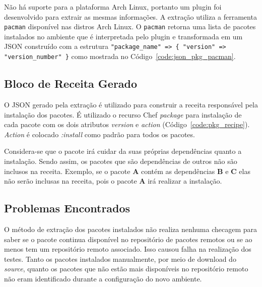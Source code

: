 Não há suporte para a plataforma Arch Linux, portanto um plugin foi desenvolvido
para extrair as mesmas informações. A extração utiliza a ferramenta \texttt{pacman} disponível
nas distros Arch Linux. O \texttt{pacman} retorna uma lista de pacotes instalados no ambiente
que é interpretada pelo plugin e transformada em um JSON construído com a estrutura
\texttt{"package\_name" => \{ "version" => "version\_number" \}} como mostrada no
Código~\ref{code:json_pkg_pacman}.

\noindent\begin{minipage}{\textwidth}
  \lstset{style=shell}
  
\end{minipage}\hfill

\subsection{Bloco de Receita Gerado}

O JSON gerado pela extração é utilizado para construir a receita responsável pela instalação dos
pacotes. É utilizado o recurso Chef \textit{package} para instalação de cada pacote com os dois atributos
\textit{version} e \textit{action} (Código~\ref{code:pkg_recipe}). \textit{Action} é colocado \textit{\textit{:install}}
como padrão para todos os pacotes.

\noindent\begin{minipage}{\textwidth}
  \lstset{style=shell}
  
\end{minipage}\hfill

Considera-se que o pacote irá cuidar da suas próprias dependências quanto a instalação.
Sendo assim, os pacotes que são dependências de outros não são inclusos na receita. Exemplo, se o pacote
\textbf{A} contém as dependências \textbf{B} e \textbf{C} elas não serão inclusas na receita, pois o pacote \textbf{A} irá realizar a instalação.

\subsection{Problemas Encontrados}

O método de extração dos pacotes instalados não realiza nenhuma checagem para
saber se o pacote continua disponível no repositório de pacotes remotos ou
se ao menos tem um repositório remoto associado. Isso causou falha na realização
dos testes. Tanto os pacotes instalados manualmente, por meio de download do
\textit{source}, quanto os pacotes que não estão mais disponíveis no repositório remoto
não eram identificado durante a configuração do novo ambiente.

